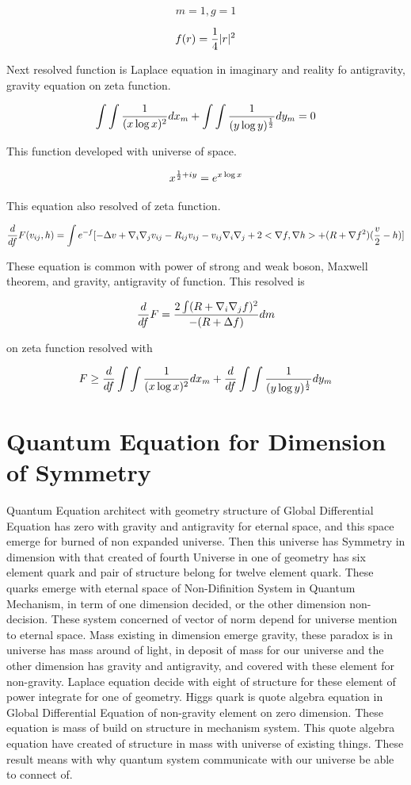 \documentclass{jsarticle}
\begin{document}
  $$ m = 1, g = 1 $$

  $$ f(r) = {1 \over 4}|r|^2 $$

  Next resolved function is Laplace equation in imaginary and reality fo antigravity, gravity equation on
zeta function.

$$ \int \int {1 \over (x \log x)^2}dx_{m} + \int \int {1 \over (y \log y)^{1 \over 2}}dy_{m} = 0  $$

  This function developed with universe of space.

  $$ x^{{1 \over 2} + iy} = e^{x \log x} $$
  
  This equation also resolved of zeta function.
 

  $$ {d \over df} F(v_{ij},h) = \int e^{-f} [- \Delta v + \nabla_{i} \nabla_{j} v_{ij} - R_{ij} v_{ij} 
  - v_{ij} \nabla_{i} \nabla_{j} + 2 < \nabla f, \nabla h> + (R + \nabla f^2)({v \over 2} - h)]  $$

  These equation is common with power of strong and weak boson, Maxwell theorem, and gravity, antigravity
of function. This resolved is

$$ {d \over df}F = {2 \int (R + \nabla_{i} \nabla_{j} f)^2 \over - (R + \Delta f)}dm $$

  on zeta function resolved with

  $$ F \ge {d \over df} \int \int {1 \over (x \log x)^2}dx_{m} + {d \over df} \int \int {1 \over (y \log y)^{1 \over 2}
  }dy_{m} $$


\section{Quantum Equation for Dimension of Symmetry}

  Quantum Equation architect with geometry structure of Global Differential Equation has zero with gravity and
antigravity for eternal space, and this space emerge for burned of non expanded universe. Then this universe has
Symmetry in dimension with that created of fourth Universe in one of geometry has six element quark and pair of 
structure belong for twelve element quark. These quarks emerge with eternal space of Non-Difinition System in Quantum
Mechanism, in term of one dimension decided, or the other dimension non-decision. These system concerned of vector of
norm depend for universe mention to eternal space. Mass existing in dimension emerge gravity, these paradox is
in universe has mass around of light, in deposit of mass for our universe and the other dimension has gravity
and antigravity, and covered with these element for non-gravity. Laplace equation decide with eight of structure
for these element of power integrate for one of geometry. Higgs quark is quote algebra equation in Global Differential
Equation of non-gravity element on zero dimension. These equation is mass of build on structure in mechanism system.
This quote algebra equation have created of structure in mass with universe of existing things.
These result means with why quantum system communicate with our universe be able to connect of.
\end{document}
